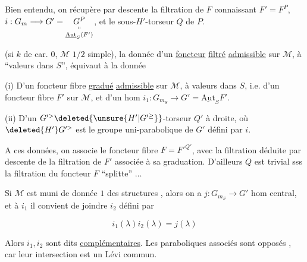 
Bien entendu, on récupère par descente la filtration de $F$ connaissant $F'=F^P$, $i:G_m\longrightarrow G'=\underset{\underline{\mathrm{Aut}}_S(F')}{\underset{\shortparallel}{G^P}}$, et le sous-$H'$-torseur  $Q$ de $P$.

 (si $k$ de car. $0$, $\mathcal M$ $1/2$ simple), la donnée d'un \uline{foncteur}  \uline{filtré} \uline{admissible} sur $\mathcal M$, à ``valeurs dans $S$'', équivaut à la donnée

(i) D'un foncteur fibre \uline{gradué} \uline{admissible}  sur $\mathcal M$, à valeurs dans $S$, i.e. d'un foncteur fibre $F'$ sur $\mathcal M$, et d'un hom $i_1:G_{m_S}\longrightarrow G'=\underline{\mathrm{Aut}}_S F'$.

(ii) D'un $G'^{>}\deleted{\unsure{H'|G'^{\geq}}}$-torseur  $Q'$ à droite, où $\deleted{H'}G'^{>}$  est le  groupe uni-parabolique de $G'$ défini par $i$.

A ces données, on associe le foncteur fibre $F=F'^{Q'}$, avec la filtration déduite par descente de la filtration  de $F'$  associée  à sa graduation. D'ailleurs $Q$ est trivial sss la filtration du foncteur $F$ ``splitte'' $\ldots$

Si $\mathcal M$ est muni de  donnée  $1$ des structures ,  alors on a $j:G_{m_S}\longrightarrow G'$ hom central, et à $i_1$ il convient de joindre $i_2$ défini par

\[
i_1(\lambda)i_2(\lambda)=j(\lambda)
\]

Alors $i_1,i_2$ sont dits \uline{complémentaires}. Les paraboliques associés sont opposés , car leur intersection est un Lévi commun.
